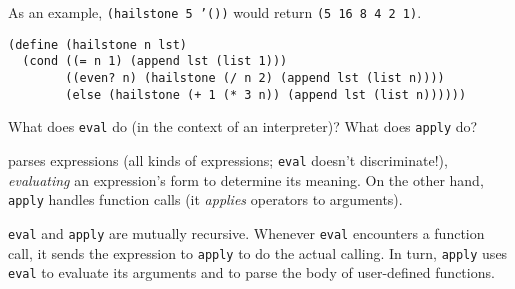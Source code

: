 \documentclass[twoside]{article}
\newcommand{\solution}[1]{{\color{red}#1}}
\begin{document}
\begin{enumerate}
As an example, {\tt (hailstone 5 '())} would return {\tt (5 16 8 4 2 1)}.


\begin{lstlisting}
(define (hailstone n lst)
  (cond ((= n 1) (append lst (list 1)))
        ((even? n) (hailstone (/ n 2) (append lst (list n))))
        (else (hailstone (+ 1 (* 3 n)) (append lst (list n))))))
\end{lstlisting}


What does {\tt eval} do (in the context of an interpreter)? What does {\tt apply} do?

\solution{{\tt eval} parses expressions (all kinds of expressions; {\tt eval} doesn't discriminate!), \emph{evaluating} an expression's form to determine its meaning. On the other hand, {\tt apply} handles function calls (it \emph{applies} operators to arguments).

{\tt eval} and {\tt apply} are mutually recursive. Whenever {\tt eval} encounters a function call, it sends the expression to {\tt apply} to do the actual calling. In turn, {\tt apply} uses {\tt eval} to evaluate its arguments and to parse the body of user-defined functions.}

\end{enumerate}
\end{document}
